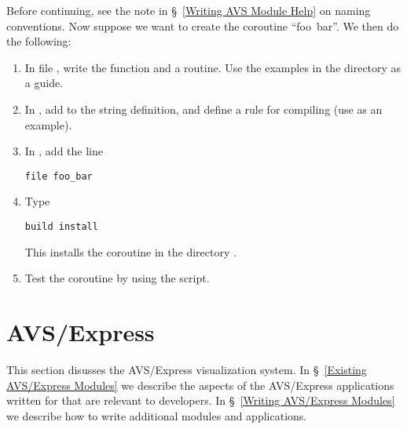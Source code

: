 Before continuing, see the note in \S~\ref{Writing AVS Module Help}
on naming conventions.
Now suppose we want to create the coroutine ``foo~bar''.
We then do the following:
\begin{enumerate}

\item
In file , write the function 
and a  routine.
Use the examples in the  directory as a guide.

\item
In , add  to the 
string definition, and define a rule for compiling 
(use  as an example).

\item
In , add the line
\begin{display}\begin{verbatim}
file foo_bar
\end{verbatim}\end{display}

\item
Type
\begin{display}\begin{verbatim}
build install
\end{verbatim}\end{display}
This installs the coroutine in the directory
.

\item
Test the coroutine by using the  script.

\end{enumerate}



\section{AVS/Express}
\label{AVS/Express}

This section disusses the AVS/Express visualization system.
In \S~\ref{Existing AVS/Express Modules} we describe the aspects of the
AVS/Express applications written for \parflow{} that are relevant to
developers.
In \S~\ref{Writing AVS/Express Modules} we describe how to write additional
modules and applications.


